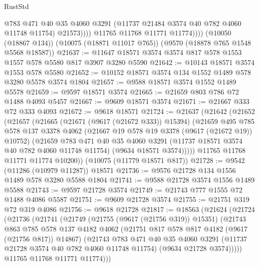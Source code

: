 \begin{lexlean}{RustStd}
\begin{coremodule}
{\begin{coremodule}
{{{{{{{{{{{{{{{{{{{{{{{{{{{{{{{{{                    @783
                    @471
                    @40
                    @35
                    @4060
                    @3291
                    (@11737 @21484 @3574 @40 @782 @4060 @11748 @11754)
                    @21573))))
            @11765
            @11768
            @11771
            @11774))))
    (@10050 (@18867 @134))
    (@10075 (@18871 @11017 @765))
    (@9570 (@18878 @765 @1548 @5568 @18587))
@21637 := @11647 @18571 @3574 @3574 @817 @578 @1553 @1557 @578 @5580 @817 @3907 @3280 @5590
@21642 := @10143 @18571 @3574 @1553 @578 @5580
@21652 := @10152 @18571 @3574 @134 @1552 @1489 @578 @3280 @5578 @3574 @1804
@21657 := @9588 @18571 @3574 @1552 @1489 @5578
@21659 := @9597 @18571 @3574
@21665 := @21659 @803 @786 @72 @1488 @4093 @5457
@21667 := @9609 @18571 @3574
@21671 := @21667 @333 @72 @333 @4093
@21672 := @9618 @18571
@21724 := @21637
    (@21642
      (@21652
        (@21657
          (@21665
            (@21671 (@9617 (@21672 @333)) @15394)
            (@21659
              @495
              @785
              @578
              @137
              @3378
              @4062
              (@21667 @19 @578 @19 @3378 (@9617 (@21672 @19)) @10752)
              (@21659
                @783
                @471
                @40
                @35
                @4060
                @3291
                (@11737 @18571 @3574 @40 @782 @4060 @11748 @11754)
                (@9634 @18571 @3574)))))
        @11765
        @11768
        @11771
        @11774
        @10200))
    (@10075 (@11779 @18571 @817))
@21728 := @9542 (@11286 (@10979 @11287)) @18571
@21736 := @9576 @21728 @134 @1556 @1489 @578 @3280 @5588 @1804
@21741 := @9588 @21728 @3574 @1556 @1489 @5588
@21743 := @9597 @21728 @3574
@21749 := @21743 @777 @1555 @72 @1488 @4086 @5587
@21751 := @9609 @21728 @3574
@21755 := @21751 @319 @72 @319 @4086
@21756 := @9618 @21728
@21817 := @18563
    (@21624
      (@21724
        (@21736
          (@21741
            (@21749
              (@21755 (@9617 (@21756 @319)) @15351)
              (@21743
                @863
                @785
                @578
                @137
                @4182
                @4062
                (@21751 @817 @578 @817 @4182 (@9617 (@21756 @817)) @14867)
                (@21743
                  @783
                  @471
                  @40
                  @35
                  @4060
                  @3291
                  (@11737 @21728 @3574 @40 @782 @4060 @11748 @11754)
                  (@9634 @21728 @3574)))))
          @11765
          @11768
          @11771
          @11774)))
}}}}}}}}}}}}}}}}}}}}}}}}}}}}}}}}}
\end{coremodule}}
\end{coremodule}
\end{lexlean}
